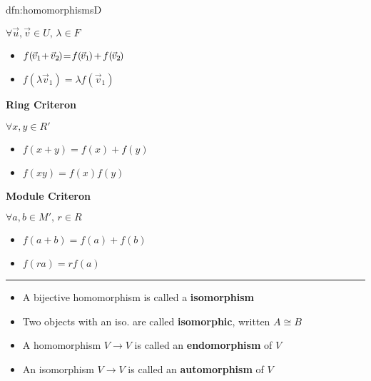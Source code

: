 \documentclass[landscape, 8pt]{extarticle}
\begin{document}
\begin{multicols}{3}
\begin{dfn}{dfn:homomorphisms}{D}
\begin{multicols}{3}
        $\forall\vec{u}, \vec{v}\in U,\,\lambda\in F$
        \begin{itemize}[leftmargin=*]
            \item $f(\hspace{-1pt}\vec{v}_{1} \hspace{-2pt} + \hspace{-1pt} \vec{v}_{2}\hspace{-1pt}) \hspace{-2pt}=\hspace{-2pt} f(\hspace{-1pt}\vec{v}_{1}\hspace{-1pt})\hspace{-1pt} +\hspace{-1pt} f(\hspace{-1pt}\vec{v}_{2}\hspace{-1pt})$
            \item $f(\lambda \vec{v}_{1}) = \lambda f(\vec{v}_{1})$
        \end{itemize}
        
        \columnbreak    

        \textbf{Ring Criteron}

        $\forall x, y\in R'$
        \begin{itemize}[leftmargin=*]
            \item $f (x + y) = f(x) + f(y)$
            \item $f(xy) = f(x)f(y)$
        \end{itemize}

        \columnbreak

        \textbf{Module Criteron}

        $\forall a, b\in M',\,r\in R$
        \begin{itemize}[leftmargin=*]
            \item $f(a + b) = f(a) + f(b)$
            \item $f(ra) = rf(a)$
        \end{itemize}
    \end{multicols}
    \setlength{\columnseprule}{0pt}
    \vspace{-15pt}

    \noindent\rule{\textwidth}{0.2pt}
    \vspace{-12pt}

    \begin{itemize}[leftmargin=*]
        \setlength\itemsep{0em}
        \item A bijective homomorphism is called a \textbf{isomorphism}
        \item Two objects with an iso. are called \textbf{isomorphic}, written $A \cong B$
        \item A homomorphism $V\to V$ is called an \textbf{endomorphism} of $V$
        \item An isomorphism $V\to V$ is called an \textbf{automorphism} of $V$
    \end{itemize}


\end{dfn}
\end{multicols}
\end{document}

